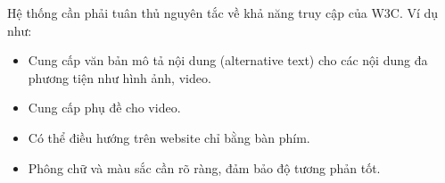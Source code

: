 \documentclass[./../main_file.tex]{subfiles}
\begin{document}
	Hệ thống cần phải tuân thủ nguyên tắc về khả năng truy cập của W3C\cite{Sha19}. Ví dụ như:
	
	\begin{itemize}
		\item Cung cấp văn bản mô tả nội dung (alternative text) cho các nội dung đa phương tiện như hình ảnh, video.
		\item Cung cấp phụ đề cho video.
		\item Có thể điều hướng trên website chỉ bằng bàn phím.
		\item Phông chữ và màu sắc cần rõ ràng, đảm bảo độ tương phản tốt.
	\end{itemize}
\end{document}
